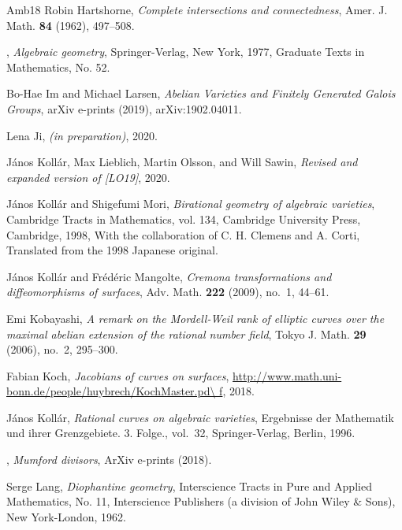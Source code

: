 \documentclass{amsart}
\theoremstyle{definition}
\theoremstyle{remark}
\begin{document}
\begin{thebibliography}{{Amb}18}
Robin Hartshorne, \emph{Complete intersections and connectedness}, Amer. J.
  Math. \textbf{84} (1962), 497--508. 

\bysame, \emph{Algebraic geometry}, Springer-Verlag, New York, 1977, Graduate
  Texts in Mathematics, No. 52. 

Bo-Hae {Im} and Michael {Larsen}, \emph{{Abelian Varieties and Finitely
  Generated Galois Groups}}, arXiv e-prints (2019), arXiv:1902.04011.

Lena Ji, \emph{(in preparation)}, 2020.

J{\'a}nos Koll{\'a}r, Max Lieblich, Martin Olsson, and Will Sawin,
  \emph{Revised and expanded version of {[LO19]}}, 2020.

J{\'a}nos Koll{\'a}r and Shigefumi Mori, \emph{Birational geometry of algebraic
  varieties}, Cambridge Tracts in Mathematics, vol. 134, Cambridge University
  Press, Cambridge, 1998, With the collaboration of C. H. Clemens and A. Corti,
  Translated from the 1998 Japanese original.

J{\'a}nos Koll{\'a}r and Fr{\'e}d{\'e}ric Mangolte, \emph{Cremona
  transformations and diffeomorphisms of surfaces}, Adv. Math. \textbf{222}
  (2009), no.~1, 44--61. 

Emi Kobayashi, \emph{A remark on the {M}ordell-{W}eil rank of elliptic curves
  over the maximal abelian extension of the rational number field}, Tokyo J.
  Math. \textbf{29} (2006), no.~2, 295--300. 

Fabian Koch, \emph{Jacobians of curves on surfaces},
  \url{http://www.math.uni-bonn.de/people/huybrech/KochMaster.pd\ f}, 2018.

J{\'a}nos Koll{\'a}r, \emph{Rational curves on algebraic varieties}, Ergebnisse
  der Mathematik und ihrer Grenzgebiete. 3. Folge., vol.~32, Springer-Verlag,
  Berlin, 1996.

\bysame, \emph{{Mumford divisors}}, ArXiv e-prints (2018).

Serge Lang, \emph{Diophantine geometry}, Interscience Tracts in Pure and
  Applied Mathematics, No. 11, Interscience Publishers (a division of John
  Wiley \& Sons), New York-London, 1962. 


\end{thebibliography}
\end{document}
